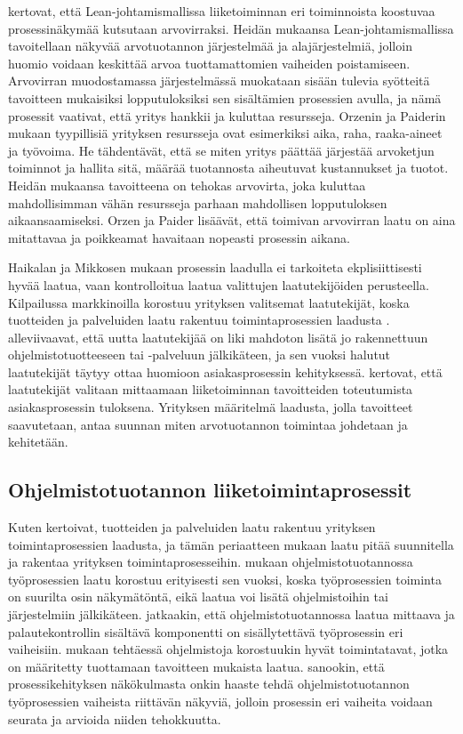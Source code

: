 \documentclass[finnish,12pt,a4paper,pdftex]{article}
\begin{document}
\cite{leanit} kertovat, että Lean-johtamismallissa liiketoiminnan eri toiminnoista koostuvaa prosessinäkymää kutsutaan arvovirraksi. Heidän mukaansa Lean-johtamismallissa tavoitellaan näkyvää arvotuotannon järjestelmää ja alajärjestelmiä, jolloin huomio voidaan keskittää arvoa tuottamattomien vaiheiden poistamiseen. Arvovirran muodostamassa järjestelmässä muokataan sisään tulevia syötteitä tavoitteen mukaisiksi lopputuloksiksi sen sisältämien prosessien avulla, ja nämä prosessit vaativat, että yritys hankkii ja kuluttaa resursseja. Orzenin ja Paiderin mukaan tyypillisiä yrityksen resursseja ovat esimerkiksi aika, raha, raaka-aineet ja työvoima. He tähdentävät, että se miten yritys päättää järjestää arvoketjun toiminnot ja hallita sitä, määrää tuotannosta aiheutuvat kustannukset ja tuotot. Heidän mukaansa tavoitteena on tehokas arvovirta, joka kuluttaa mahdollisimman vähän resursseja parhaan mahdollisen lopputuloksen aikaansaamiseksi. Orzen ja Paider lisäävät, että toimivan arvovirran laatu on aina mitattavaa ja poikkeamat havaitaan nopeasti prosessin aikana.

Haikalan ja Mikkosen \citeyearpar{okaytannot} mukaan prosessin laadulla ei tarkoiteta ekplisiittisesti hyvää laatua, vaan kontrolloitua laatua valittujen laatutekijöiden perusteella. Kilpailussa markkinoilla korostuu yrityksen valitsemat laatutekijät, koska tuotteiden ja palveluiden laatu rakentuu toimintaprosessien laadusta \citep{ohjelmistotuotanto, teollisuustalous}. \cite{okaytannot} alleviivaavat, että uutta laatutekijää on liki mahdoton lisätä jo rakennettuun ohjelmistotuotteeseen tai -palveluun jälkikäteen, ja sen vuoksi halutut laatutekijät täytyy ottaa huomioon asiakasprosessin kehityksessä. \cite{ohjelmistotuotanto} kertovat, että laatutekijät valitaan mittaamaan liiketoiminnan tavoitteiden toteutumista asiakasprosessin tuloksena. Yrityksen määritelmä laadusta, jolla tavoitteet saavutetaan, antaa suunnan miten arvotuotannon toimintaa johdetaan ja kehitetään. 



\subsection{Ohjelmistotuotannon liiketoimintaprosessit}

Kuten \cite{teollisuustalous} kertoivat, tuotteiden ja palveluiden laatu rakentuu yrityksen toimintaprosessien laadusta, ja tämän periaatteen mukaan laatu pitää suunnitella ja rakentaa yrityksen toimintaprosesseihin. \cite{ohjelmistotuotanto, devops} mukaan ohjelmistotuotannossa työprosessien laatu korostuu erityisesti sen vuoksi, koska työprosessien toiminta on suurilta osin näkymätöntä, eikä laatua voi lisätä ohjelmistoihin tai järjestelmiin jälkikäteen. \citeauthor{devops} jatkaakin, että ohjelmistotuotannossa laatua mittaava ja palautekontrollin sisältävä komponentti on sisällytettävä työprosessin eri vaiheisiin. \cite{okaytannot} mukaan tehtäessä ohjelmistoja korostuukin hyvät toimintatavat, jotka on määritetty tuottamaan tavoitteen mukaista laatua. \cite{ohjelmistotuotanto} sanookin, että prosessikehityksen näkökulmasta onkin haaste tehdä ohjelmistotuotannon työprosessien vaiheista riittävän näkyviä, jolloin prosessin eri vaiheita voidaan seurata ja arvioida niiden tehokkuutta.
\end{document}
